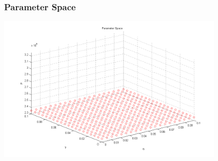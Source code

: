 \begin{frame}
    \frametitle{Parameter Space}
\hspace*{-1cm}
\includegraphics[height=7cm]{parameterspace2}
\end{frame}



